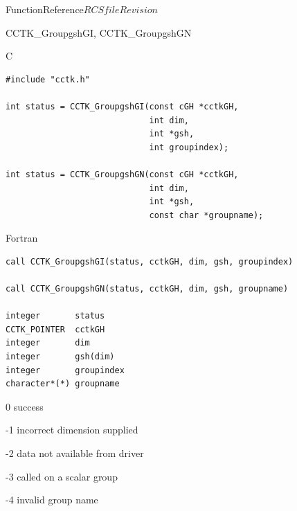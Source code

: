 \begin{cactuspart}{FunctionReference}{$RCSfile$}{$Revision$}
\begin{FunctionDescription}{CCTK\_GroupgshGI, CCTK\_GroupgshGN}
\begin{SynopsisSection}
\begin{Synopsis}{C}
\begin{verbatim}
#include "cctk.h"

int status = CCTK_GroupgshGI(const cGH *cctkGH,
                             int dim,
                             int *gsh,
                             int groupindex);

int status = CCTK_GroupgshGN(const cGH *cctkGH,
                             int dim,
                             int *gsh,
                             const char *groupname);
\end{verbatim}
\end{Synopsis}
\begin{Synopsis}{Fortran}
\begin{verbatim}
call CCTK_GroupgshGI(status, cctkGH, dim, gsh, groupindex)

call CCTK_GroupgshGN(status, cctkGH, dim, gsh, groupname)

integer       status
CCTK_POINTER  cctkGH
integer       dim
integer       gsh(dim)
integer       groupindex
character*(*) groupname
\end{verbatim}
\end{Synopsis}
\end{SynopsisSection}

\begin{ResultSection}
\begin{Result}{\rm 0} success \end{Result}
\begin{Result}{\rm -1} incorrect dimension supplied \end{Result}
\begin{Result}{\rm -2} data not available from driver \end{Result}
\begin{Result}{\rm -3} called on a scalar group \end{Result}
\begin{Result}{\rm -4} invalid group name \end{Result}
\end{ResultSection}


\end{FunctionDescription}
\end{cactuspart}
